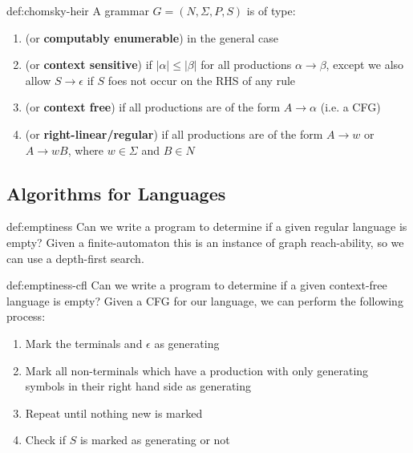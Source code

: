 \documentclass[landscape, 8pt]{extarticle}
\begin{document}
\begin{multicols}{3}
\begin{dfn}{def:chomsky-heir}{}
A grammar $G = (N,\Sigma, P, S)$ is of type:
\renewcommand\labelitemi{\tiny$\bullet$}
\begin{enumerate}\addtocounter{enumi}{-1}
    \setlength\itemsep{0em}
    \item (or \textbf{computably enumerable}) in the general case
    \item (or \textbf{context sensitive}) if $\lvert \alpha \rvert \le \lvert  \beta\rvert $ for all productions $\alpha\to \beta$, except we also allow $S\to \epsilon$ if $S$ foes not occur on the RHS of any rule
    \item (or \textbf{context free}) if all productions are of the form $A\to \alpha$ (i.e. a CFG)
    \item (or \textbf{right-linear/regular}) if all productions are of the form $A\to w$ or $A\to wB$, where $w\in \Sigma$ and $B\in N$
\end{enumerate}
\end{dfn}

\subsection*{Algorithms for Languages}
\begin{thm}{def:emptiness}{}
Can we write a program to determine if a given regular language is empty?
\newline
Given a finite-automaton this is an instance of graph reach-ability, so we can use a depth-first search.
\end{thm}

\begin{thm}{def:emptiness-cfl}{}
Can we write a program to determine if a given context-free language is empty?
\newline
Given a CFG for our language, we can perform the following process:
\begin{enumerate}
    \item Mark the terminals and $\epsilon$ as generating
    \item Mark all non-terminals which have a production with only generating symbols in their right hand side as generating
    \item Repeat until nothing new is marked
    \item Check if $S$ is marked as generating or not
\end{enumerate}
\end{thm}


\end{multicols}
\end{document}
